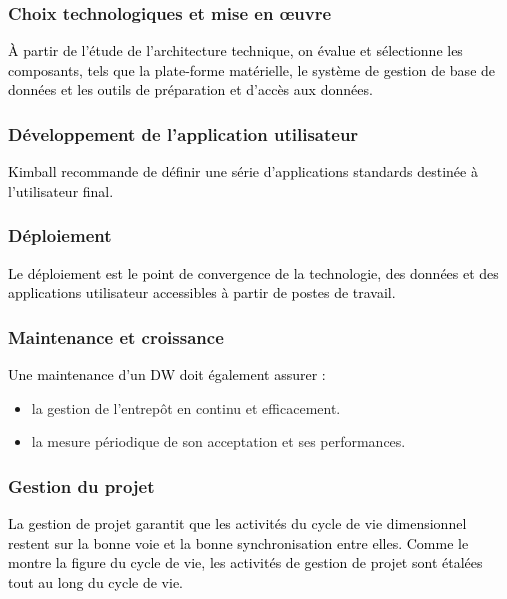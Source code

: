 \documentclass[a4paper,12pt]{report}
\begin{document}
\subsubsection{	Choix technologiques et mise en œuvre}

\textcolor{black}{À partir de l’étude de l’architecture technique, on évalue et sélectionne les composants, tels que la plate-forme matérielle, le système de gestion de base de données et les outils de préparation et d’accès aux données. }

\subsubsection{Développement de l’application utilisateur}

\textcolor{black}{Kimball recommande de définir une série d’applications standards destinée à l’utilisateur final.}

\subsubsection{Déploiement}

\textcolor{black}{Le déploiement est le point de convergence de la technologie, des données et des applications utilisateur accessibles à partir de postes de travail. }

\subsubsection{Maintenance et croissance}

\textcolor{black}{Une maintenance  d’un DW doit également assurer \citep{kimball2008data} :}

\begin{itemize}

\item	la gestion de l’entrepôt en continu et efficacement.
\item	la mesure périodique de son acceptation et ses performances.

\end{itemize}

\subsubsection{Gestion du projet}

\textcolor{black}{La gestion de projet garantit que les activités du cycle de vie dimensionnel restent sur la bonne voie et la bonne synchronisation entre elles. Comme le montre la figure du cycle de vie, les activités de gestion de projet sont étalées tout au long du cycle de vie. 
}
\end{document}
